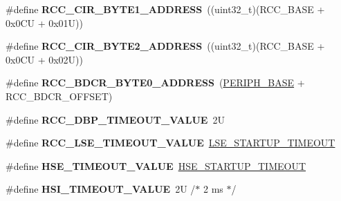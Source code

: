 \begin{DoxyCompactItemize}
\#define {\bfseries R\+C\+C\+\_\+\+C\+I\+R\+\_\+\+B\+Y\+T\+E1\+\_\+\+A\+D\+D\+R\+E\+SS}~((uint32\+\_\+t)(R\+C\+C\+\_\+\+B\+A\+SE + 0x0\+C\+U + 0x01\+U))
\item 
\mbox{\label{group___r_c_c___bit_address___alias_region_ga1387fb2dfadb830eb83ab2772c8d2294}} 
\#define {\bfseries R\+C\+C\+\_\+\+C\+I\+R\+\_\+\+B\+Y\+T\+E2\+\_\+\+A\+D\+D\+R\+E\+SS}~((uint32\+\_\+t)(R\+C\+C\+\_\+\+B\+A\+SE + 0x0\+C\+U + 0x02\+U))
\item 
\mbox{\label{group___r_c_c___bit_address___alias_region_ga12a7b221df58454d4c59e1d3109b72f2}} 
\#define {\bfseries R\+C\+C\+\_\+\+B\+D\+C\+R\+\_\+\+B\+Y\+T\+E0\+\_\+\+A\+D\+D\+R\+E\+SS}~(\hyperlink{group___peripheral__memory__map_ga9171f49478fa86d932f89e78e73b88b0}{P\+E\+R\+I\+P\+H\+\_\+\+B\+A\+SE} + R\+C\+C\+\_\+\+B\+D\+C\+R\+\_\+\+O\+F\+F\+S\+ET)
\item 
\mbox{\label{group___r_c_c___bit_address___alias_region_gae578b5efd6bd38193ab426ce65cb77b1}} 
\#define {\bfseries R\+C\+C\+\_\+\+D\+B\+P\+\_\+\+T\+I\+M\+E\+O\+U\+T\+\_\+\+V\+A\+L\+UE}~2U
\item 
\mbox{\label{group___r_c_c___bit_address___alias_region_gafe8ed1c0ca0e1c17ea69e09391498cc7}} 
\#define {\bfseries R\+C\+C\+\_\+\+L\+S\+E\+\_\+\+T\+I\+M\+E\+O\+U\+T\+\_\+\+V\+A\+L\+UE}~\hyperlink{stm32f4xx__hal__conf_8h_a85e6fc812dc26f7161a04be2568a5462}{L\+S\+E\+\_\+\+S\+T\+A\+R\+T\+U\+P\+\_\+\+T\+I\+M\+E\+O\+UT}
\item 
\mbox{\label{group___r_c_c___bit_address___alias_region_gac0cd4ed24fa948844e1a40b12c450f32}} 
\#define {\bfseries H\+S\+E\+\_\+\+T\+I\+M\+E\+O\+U\+T\+\_\+\+V\+A\+L\+UE}~\hyperlink{stm32f4xx__hal__conf_8h_a68ecbc9b0a1a40a1ec9d18d5e9747c4f}{H\+S\+E\+\_\+\+S\+T\+A\+R\+T\+U\+P\+\_\+\+T\+I\+M\+E\+O\+UT}
\item 
\mbox{\label{group___r_c_c___bit_address___alias_region_gad9e56670dcbbe9dbc3a8971b36bbec58}} 
\#define {\bfseries H\+S\+I\+\_\+\+T\+I\+M\+E\+O\+U\+T\+\_\+\+V\+A\+L\+UE}~2\+U  /$\ast$ 2 ms $\ast$/
\item 

\end{DoxyCompactItemize}
